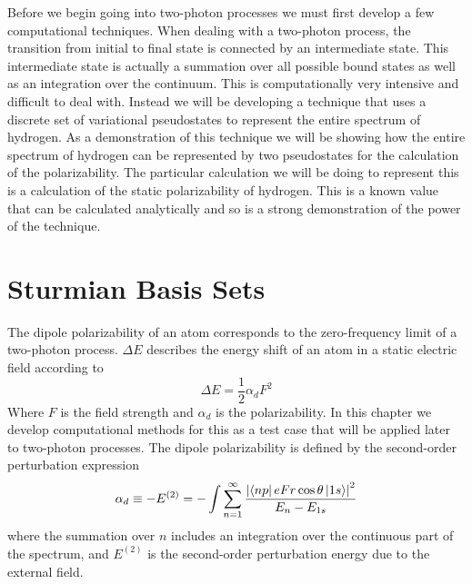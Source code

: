 Before we begin going into two-photon processes we must first develop a few computational techniques. When dealing with a two-photon process, the transition from initial to final state is connected by an intermediate state. This intermediate state is actually a summation over all possible bound states as well as an integration over the continuum. This is computationally very intensive and difficult to deal with. Instead we will be developing a technique that uses a discrete set of variational pseudostates to represent the entire spectrum of hydrogen. As a demonstration of this technique we will be showing how the entire spectrum of hydrogen can be represented by two pseudostates for the calculation of the polarizability. The particular calculation we will be doing to represent this is a calculation of the static polarizability of hydrogen. This is a known value that can be calculated analytically and so is a strong demonstration of the power of the technique.
\section{Sturmian Basis Sets}
The dipole polarizability of an atom corresponds to the zero-frequency limit of a two-photon process. \(\Delta E\) describes the energy shift of an atom in a static electric field according to
\begin{equation}
    \Delta E = \frac{1}{2}\alpha_d F^2
\end{equation}
Where \(F\) is the field strength and $\alpha_d$ is the polarizability. In this chapter we develop computational methods for this as a test case that will be applied later to two-photon processes. The dipole polarizability is defined by the second-order perturbation expression \cite{variational}
\begin{equation}
    \alpha_{d}\equiv- E^{(2)}=-\int\sum_{n=1}^{\infty}\frac{\abs{\bra{np}eFr\cos{\theta}\ket{1s}}^{2}}{E_{n}-E_{1s}}
\end{equation}
where the summation over $n$ includes an integration over the continuous part of the spectrum, and $E^{(2)}$ is the second-order perturbation energy due to the external field.

